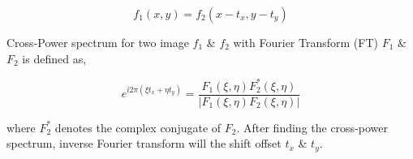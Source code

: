\documentclass[twoside]{iitbreport}
\begin{document}
\begin{equation}\label{eq:translation}
    f_1 (x,y) = f_2 (x-t_x,y-t_y)    
\end{equation}

\noindent
Cross-Power spectrum for two image ${f_1}$ \& ${f_2}$ with Fourier Transform (FT) ${F_1}$ \& ${F_2}$ is defined as,

\begin{equation}\label{eq:cross-power-spectrum}
    e^{i2\pi (\xi t_x + \eta t_y)} = \frac{ F_1(\xi,\eta) F_2^*(\xi,\eta)}{ |F_1(\xi,\eta) F_2(\xi,\eta)| }     
\end{equation}

\noindent
where ${F_2^*}$ denotes the complex conjugate of ${F_2}$. After finding the cross-power spectrum, inverse Fourier transform will the shift offset ${t_x}$ \& ${t_y}$. \\
\end{document}

